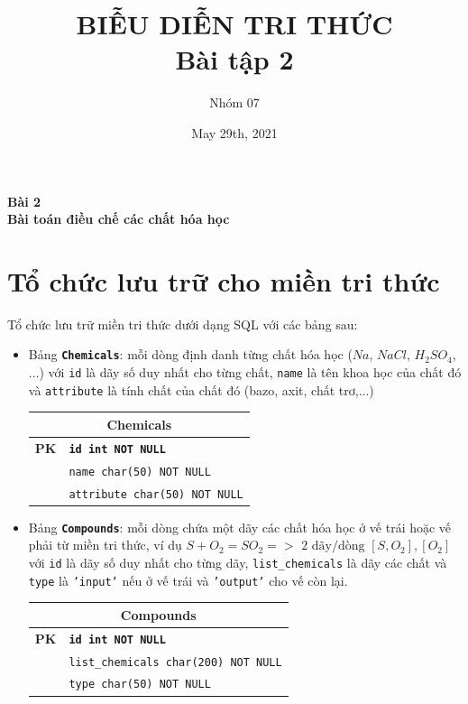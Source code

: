 \documentclass[a4paper]{article}
\title{BIỄU DIỄN TRI THỨC\\ Bài tập 2}
\author{Nhóm 07}
\date{May 29th, 2021}
\begin{document}
	\maketitle
	\begin{center}
		\LARGE{\textbf{Bài 2\\Bài toán điều chế các chất hóa học}}
	\end{center}
	
	\section{Tổ chức lưu trữ cho miền tri thức} 	
	
	Tổ chức lưu trữ miền tri thức dưới dạng SQL với các bảng sau:
	\begin{itemize}
		\item Bảng \textbf{\texttt{Chemicals}}: mỗi dòng định danh từng chất hóa học ($Na$, $NaCl$, $H_2SO_4$, $\dots$) với \texttt{id} là dãy số duy nhất cho từng chất, \texttt{name} là tên khoa học của chất đó và \texttt{attribute} là tính chất của chất đó (bazo, axit, chất trơ,...)
		
		\begin{tabular}{|c|l|}
			\hline
			\multicolumn{2}{|c|}{\textbf{Chemicals}} \\
			\hline
			\textbf{PK} & \texttt{\textbf{id int NOT NULL}} \\
			\hline
			& \texttt{name char(50) NOT NULL} \\
			\hline
			& \texttt{attribute char(50) NOT NULL} \\
			\hline
		\end{tabular}
	
		\item Bảng \textbf{\texttt{Compounds}}: mỗi dòng chứa một dãy các chất hóa học ở vế trái hoặc vế phải từ miền tri thức, ví dụ \texttt{$S + O_2 = SO_2 => \text{ 2 dãy/dòng } [S,O_2], [O_2]$} với \texttt{id} là dãy số duy nhất cho từng dãy, \texttt{list\_chemicals} là dãy các chất và \texttt{type} là \texttt{'input'} nếu ở vế trái và \texttt{'output'} cho vế còn lại.
		
		\begin{tabular}{|c|l|}
			\hline
			\multicolumn{2}{|c|}{\textbf{Compounds}} \\
			\hline
			\textbf{PK} & \texttt{\textbf{id int NOT NULL}} \\
			\hline
			& \texttt{list\_chemicals char(200) NOT NULL} \\
			\hline
			& \texttt{type char(50) NOT NULL} \\
			\hline
		\end{tabular}
	

\end{itemize}
\end{document}
